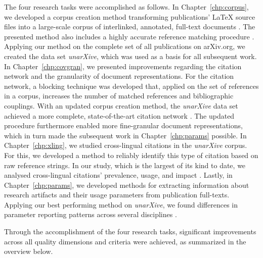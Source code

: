 The four research tasks were accomplished as follows. %
In Chapter~\ref{chp:corpus}, we developed a corpus creation method transforming publications' \LaTeX{} source files into a large-scale corpus of interlinked, annotated, full-text documents \rtmark{1\large\checkmark}. The presented method also includes a highly accurate reference matching procedure . Applying our method on the complete set of all publications on arXiv.org, we created the data set \emph{unarXive}, which was used as a basis for all subsequent work. %
In Chapter~\ref{chp:covgran}, we presented improvements regarding the citation network and the granularity of document representations. For the citation network, a blocking technique was developed that, applied on the set of references in a corpus, increases the number of matched references and bibliographic couplings. With an updated corpus creation method, the \emph{unarXive} data set achieved a more complete, state-of-the-art citation network \rtmark{2\large\checkmark}. The updated procedure furthermore enabled more fine-granular document representations, which in turn made the subsequent work in Chapter~\ref{chp:params} possible. %
In Chapter~\ref{chp:xling}, we studied cross-lingual citations in the \emph{unarXive} corpus. For this, we developed a method to reliably identify this type of citation based on raw reference strings. In our study, which is the largest of its kind to date, we analysed cross-lingual citations' prevalence, usage, and impact \rtmark{3\large\checkmark}. %
Lastly, in Chapter~\ref{chp:params}, we developed methods for extracting information about research artifacts and their usage parameters from publication full-texts. Applying our best performing method on \emph{unarXive}, we found differences in parameter reporting patterns across several disciplines \rtmark{4\large\checkmark}. %

Through the accomplishment of the four research tasks, significant improvements across all quality dimensions and criteria were achieved, as summarized in the overview below.

